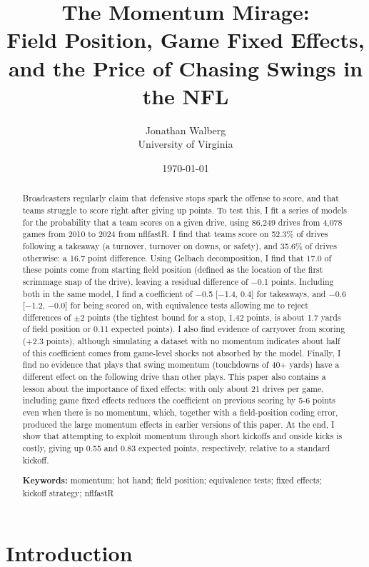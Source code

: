 \documentclass[11pt]{article}
\title{The Momentum Mirage:\\
       \large Field Position, Game Fixed Effects, and the Price of Chasing Swings in the NFL}
\author{Jonathan Walberg\\University of Virginia}
\date{\today}
\begin{document}
\maketitle

\begin{abstract}
\noindent Broadcasters regularly claim that defensive stops spark the offense to score, and that teams struggle to score right after giving up points. To test this, I fit a series of models for the probability that a team scores on a given drive, using 86,249 drives from 4,078 games from 2010 to 2024 from nflfastR. I find that teams score on 52.3\% of drives following a takeaway (a turnover, turnover on downs, or safety), and 35.6\% of drives otherwise: a 16.7 point difference. Using Gelbach decomposition, I find that 17.0 of these points come from starting field position (defined as the location of the first scrimmage snap of the drive), leaving a residual difference of $-$0.1 points. Including both in the same model, I find a coefficient of $-$0.5 [$-$1.4, 0.4] for takeaways, and $-$0.6 [$-$1.2, $-$0.0] for being scored on, with equivalence tests allowing me to reject differences of $\pm$2 points (the tightest bound for a stop, 1.42 points, is about 1.7 yards of field position or 0.11 expected points). I also find evidence of carryover from scoring ($+$2.3 points), although simulating a dataset with no momentum indicates about half of this coefficient comes from game-level shocks not absorbed by the model. Finally, I find no evidence that plays that swing momentum (touchdowns of 40+ yards) have a different effect on the following drive than other plays. This paper also contains a lesson about the importance of fixed effects: with only about 21 drives per game, including game fixed effects reduces the coefficient on previous scoring by 5-6 points even when there is no momentum, which, together with a field-position coding error, produced the large momentum effects in earlier versions of this paper. At the end, I show that attempting to exploit momentum through short kickoffs and onside kicks is costly, giving up 0.55 and 0.83 expected points, respectively, relative to a standard kickoff.

\medskip
\noindent\textbf{Keywords:} momentum; hot hand; field position; equivalence tests;
fixed effects; kickoff strategy; nflfastR
\end{abstract}

\section{Introduction}\label{sec:intro}
\end{document}
